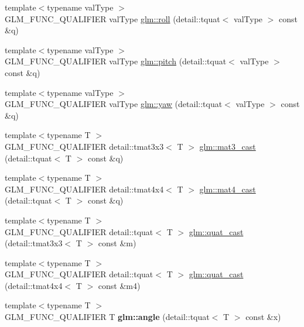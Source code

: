 \begin{DoxyCompactItemize}
\item 
{\footnotesize template$<$typename val\+Type $>$ }\\G\+L\+M\+\_\+\+F\+U\+N\+C\+\_\+\+Q\+U\+A\+L\+I\+F\+I\+E\+R val\+Type \hyperlink{group__gtc__quaternion_ga7ef4c8c1ce1ca988add2f73392db0a06}{glm\+::roll} (detail\+::tquat$<$ val\+Type $>$ const \&q)
\item 
{\footnotesize template$<$typename val\+Type $>$ }\\G\+L\+M\+\_\+\+F\+U\+N\+C\+\_\+\+Q\+U\+A\+L\+I\+F\+I\+E\+R val\+Type \hyperlink{group__gtc__quaternion_gaf2a0323dbf6c6fb3f37b445aa899c1c7}{glm\+::pitch} (detail\+::tquat$<$ val\+Type $>$ const \&q)
\item 
{\footnotesize template$<$typename val\+Type $>$ }\\G\+L\+M\+\_\+\+F\+U\+N\+C\+\_\+\+Q\+U\+A\+L\+I\+F\+I\+E\+R val\+Type \hyperlink{group__gtc__quaternion_gaac012c1a6bc37ce07a87745d9c596eed}{glm\+::yaw} (detail\+::tquat$<$ val\+Type $>$ const \&q)
\item 
{\footnotesize template$<$typename T $>$ }\\G\+L\+M\+\_\+\+F\+U\+N\+C\+\_\+\+Q\+U\+A\+L\+I\+F\+I\+E\+R detail\+::tmat3x3$<$ T $>$ \hyperlink{group__gtc__quaternion_gae04ce320008c9bec0037b4ba21853cb5}{glm\+::mat3\+\_\+cast} (detail\+::tquat$<$ T $>$ const \&q)
\item 
{\footnotesize template$<$typename T $>$ }\\G\+L\+M\+\_\+\+F\+U\+N\+C\+\_\+\+Q\+U\+A\+L\+I\+F\+I\+E\+R detail\+::tmat4x4$<$ T $>$ \hyperlink{group__gtc__quaternion_ga8c376eb15971eb52d85df5ee26825627}{glm\+::mat4\+\_\+cast} (detail\+::tquat$<$ T $>$ const \&q)
\item 
{\footnotesize template$<$typename T $>$ }\\G\+L\+M\+\_\+\+F\+U\+N\+C\+\_\+\+Q\+U\+A\+L\+I\+F\+I\+E\+R detail\+::tquat$<$ T $>$ \hyperlink{group__gtc__quaternion_ga4d37447d81ceade1d10d68c995a4d881}{glm\+::quat\+\_\+cast} (detail\+::tmat3x3$<$ T $>$ const \&m)
\item 
{\footnotesize template$<$typename T $>$ }\\G\+L\+M\+\_\+\+F\+U\+N\+C\+\_\+\+Q\+U\+A\+L\+I\+F\+I\+E\+R detail\+::tquat$<$ T $>$ \hyperlink{group__gtc__quaternion_ga24adafe33b0bcad906c8724a762e5299}{glm\+::quat\+\_\+cast} (detail\+::tmat4x4$<$ T $>$ const \&m4)
\item 
\hypertarget{namespaceglm_a80fd36fde242e1f2de6b3faed774755f}{}{\footnotesize template$<$typename T $>$ }\\G\+L\+M\+\_\+\+F\+U\+N\+C\+\_\+\+Q\+U\+A\+L\+I\+F\+I\+E\+R T {\bfseries glm\+::angle} (detail\+::tquat$<$ T $>$ const \&x)\label{namespaceglm_a80fd36fde242e1f2de6b3faed774755f}


\end{DoxyCompactItemize}
